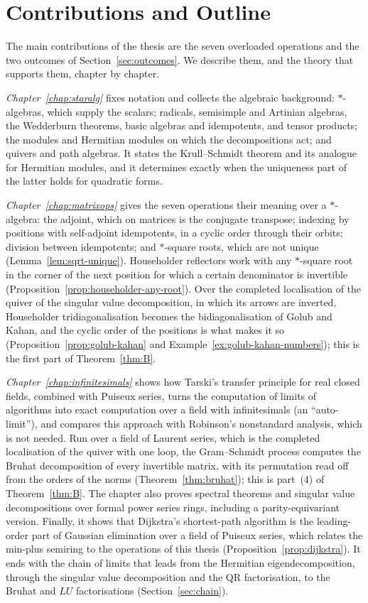 \documentclass[12pt, a4paper]{report}
\theoremstyle{plain}
\theoremstyle{definition}
\theoremstyle{remark}
\theoremstyle{plain}
\begin{document}
\section{Contributions and Outline}
\label{sec:contributions}
The main contributions of the thesis are the seven overloaded operations and the two outcomes of Section~\ref{sec:outcomes}. We describe them, and the theory that supports them, chapter by chapter.

\emph{Chapter~\ref{chap:staralg}} fixes notation and collects the algebraic background: $*$-algebras, which supply the scalars; radicals, semisimple and Artinian algebras, the Wedderburn theorems, basic algebras and idempotents, and tensor products; the modules and Hermitian modules on which the decompositions act; and quivers and path algebras. It states the Krull--Schmidt theorem and its analogue for Hermitian modules, and it determines exactly when the uniqueness part of the latter holds for quadratic forms.

\emph{Chapter~\ref{chap:matrixops}} gives the seven operations their meaning over a $*$-algebra: the adjoint, which on matrices is the conjugate transpose; indexing by positions with self-adjoint idempotents, in a cyclic order through their orbits; division between idempotents; and $*$-square roots, which are not unique (Lemma~\ref{lem:sqrt-unique}). Householder reflectors work with any $*$-square root in the corner of the next position for which a certain denominator is invertible (Proposition~\ref{prop:householder-any-root}). Over the completed localisation of the quiver of the singular value decomposition, in which its arrows are inverted, Householder tridiagonalisation becomes the bidiagonalisation of Golub and Kahan, and the cyclic order of the positions is what makes it so (Proposition~\ref{prop:golub-kahan} and Example~\ref{ex:golub-kahan-numbers}); this is the first part of Theorem~\ref{thm:B}.

\emph{Chapter~\ref{chap:infinitesimals}} shows how Tarski's transfer principle for real closed fields, combined with Puiseux series, turns the computation of limits of algorithms into exact computation over a field with infinitesimals (an ``auto-limit''), and compares this approach with Robinson's nonstandard analysis, which is not needed. Run over a field of Laurent series, which is the completed localisation of the quiver with one loop, the Gram--Schmidt process computes the Bruhat decomposition of every invertible matrix, with its permutation read off from the orders of the norms (Theorem~\ref{thm:bruhat}); this is part~(4) of Theorem~\ref{thm:B}. The chapter also proves spectral theorems and singular value decompositions over formal power series rings, including a parity-equivariant version. Finally, it shows that Dijkstra's shortest-path algorithm is the leading-order part of Gaussian elimination over a field of Puiseux series, which relates the min-plus semiring to the operations of this thesis (Proposition~\ref{prop:dijkstra}). It ends with the chain of limits that leads from the Hermitian eigendecomposition, through the singular value decomposition and the QR factorisation, to the Bruhat and $LU$ factorisations (Section~\ref{sec:chain}).
\end{document}
